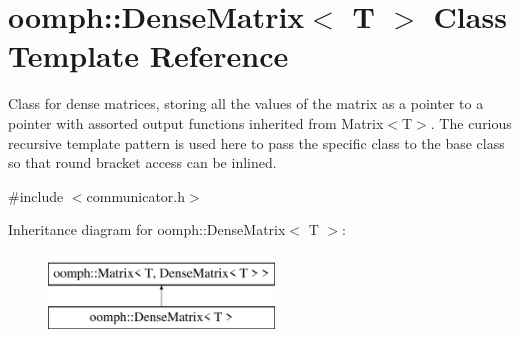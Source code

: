 \hypertarget{classoomph_1_1DenseMatrix}{}\section{oomph\+:\+:Dense\+Matrix$<$ T $>$ Class Template Reference}
\label{classoomph_1_1DenseMatrix}


Class for dense matrices, storing all the values of the matrix as a pointer to a pointer with assorted output functions inherited from Matrix$<$\+T$>$. The curious recursive template pattern is used here to pass the specific class to the base class so that round bracket access can be inlined.  




{\ttfamily \#include $<$communicator.\+h$>$}

Inheritance diagram for oomph\+:\+:Dense\+Matrix$<$ T $>$\+:\begin{figure}[H]
\begin{center}
\leavevmode
\includegraphics[height=2.000000cm]{classoomph_1_1DenseMatrix}
\end{center}
\end{figure}
